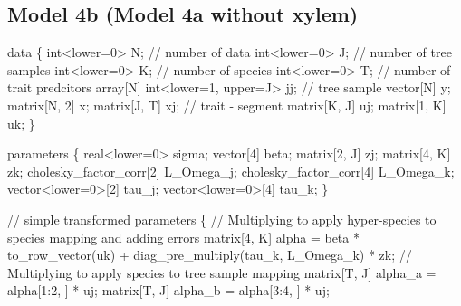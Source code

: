\documentclass[
  12pt,
  letterpaper,
  DIV=11,
  numbers=noendperiod]{scrartcl}
\newenvironment{Shaded}{\begin{snugshade}}{\end{snugshade}}
\newcommand{\CommentTok}[1]{\textcolor[rgb]{0.37,0.37,0.37}{#1}}
\newcommand{\DataTypeTok}[1]{\textcolor[rgb]{0.68,0.00,0.00}{#1}}
\newcommand{\DecValTok}[1]{\textcolor[rgb]{0.68,0.00,0.00}{#1}}
\newcommand{\KeywordTok}[1]{\textcolor[rgb]{0.00,0.23,0.31}{#1}}
\newcommand{\NormalTok}[1]{\textcolor[rgb]{0.00,0.23,0.31}{#1}}
\begin{document}
\newpage

\subsection{Model 4b (Model 4a without
xylem)}\label{model-4b-model-4a-without-xylem}

\begin{Shaded}
\begin{Highlighting}[]
\KeywordTok{data}\NormalTok{ \{}
  \DataTypeTok{int}\NormalTok{\textless{}}\KeywordTok{lower}\NormalTok{=}\DecValTok{0}\NormalTok{\textgreater{} N; }\CommentTok{// number of data}
  \DataTypeTok{int}\NormalTok{\textless{}}\KeywordTok{lower}\NormalTok{=}\DecValTok{0}\NormalTok{\textgreater{} J; }\CommentTok{// number of tree samples}
  \DataTypeTok{int}\NormalTok{\textless{}}\KeywordTok{lower}\NormalTok{=}\DecValTok{0}\NormalTok{\textgreater{} K; }\CommentTok{// number of species}
  \DataTypeTok{int}\NormalTok{\textless{}}\KeywordTok{lower}\NormalTok{=}\DecValTok{0}\NormalTok{\textgreater{} T; }\CommentTok{// number of trait predcitors}
  \DataTypeTok{array}\NormalTok{[N] }\DataTypeTok{int}\NormalTok{\textless{}}\KeywordTok{lower}\NormalTok{=}\DecValTok{1}\NormalTok{, }\KeywordTok{upper}\NormalTok{=J\textgreater{} jj; }\CommentTok{// tree sample}
  \DataTypeTok{vector}\NormalTok{[N] y;}
  \DataTypeTok{matrix}\NormalTok{[N, }\DecValTok{2}\NormalTok{] x;}
  \DataTypeTok{matrix}\NormalTok{[J, T] xj; }\CommentTok{// trait {-} segment}
  \DataTypeTok{matrix}\NormalTok{[K, J] uj;}
  \DataTypeTok{matrix}\NormalTok{[}\DecValTok{1}\NormalTok{, K] uk;}
\NormalTok{\}}

\KeywordTok{parameters}\NormalTok{ \{}
  \DataTypeTok{real}\NormalTok{\textless{}}\KeywordTok{lower}\NormalTok{=}\DecValTok{0}\NormalTok{\textgreater{} sigma;}
  \DataTypeTok{vector}\NormalTok{[}\DecValTok{4}\NormalTok{] beta;}
  \DataTypeTok{matrix}\NormalTok{[}\DecValTok{2}\NormalTok{, J] zj;}
  \DataTypeTok{matrix}\NormalTok{[}\DecValTok{4}\NormalTok{, K] zk;}
  \DataTypeTok{cholesky\_factor\_corr}\NormalTok{[}\DecValTok{2}\NormalTok{] L\_Omega\_j;}
  \DataTypeTok{cholesky\_factor\_corr}\NormalTok{[}\DecValTok{4}\NormalTok{] L\_Omega\_k;}
  \DataTypeTok{vector}\NormalTok{\textless{}}\KeywordTok{lower}\NormalTok{=}\DecValTok{0}\NormalTok{\textgreater{}[}\DecValTok{2}\NormalTok{] tau\_j;}
  \DataTypeTok{vector}\NormalTok{\textless{}}\KeywordTok{lower}\NormalTok{=}\DecValTok{0}\NormalTok{\textgreater{}[}\DecValTok{4}\NormalTok{] tau\_k;}
\NormalTok{\}}

\CommentTok{// simple}
\KeywordTok{transformed parameters}\NormalTok{ \{}
  \CommentTok{// Multiplying to apply hyper{-}species to species mapping and adding errors}
  \DataTypeTok{matrix}\NormalTok{[}\DecValTok{4}\NormalTok{, K] alpha = beta * to\_row\_vector(uk) + diag\_pre\_multiply(tau\_k, L\_Omega\_k) * zk;}
  \CommentTok{// Multiplying to apply species to tree sample mapping}
  \DataTypeTok{matrix}\NormalTok{[T, J] alpha\_a = alpha[}\DecValTok{1}\NormalTok{:}\DecValTok{2}\NormalTok{, ] * uj;}
  \DataTypeTok{matrix}\NormalTok{[T, J] alpha\_b = alpha[}\DecValTok{3}\NormalTok{:}\DecValTok{4}\NormalTok{, ] * uj;}


\end{Highlighting}
\end{Shaded}
\end{document}
